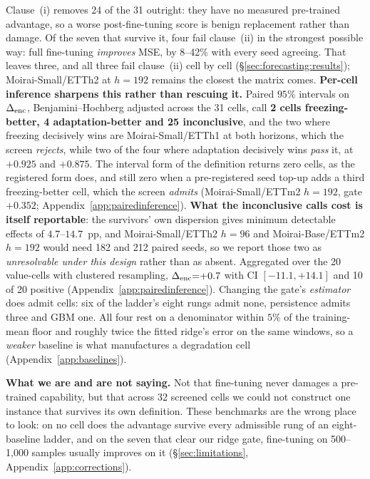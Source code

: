 Clause~(i) removes 24 of the 31 outright: they have no measured pre-trained
advantage, so a worse post-fine-tuning score is benign replacement rather than
damage.  Of the seven that survive it, four fail clause~(ii) in the strongest
possible way: full fine-tuning \emph{improves} MSE, by 8--42\% with every seed
agreeing.  That leaves three, and all three fail clause~(ii) cell by cell
(\S\ref{sec:forecasting:results}); Moirai-Small/ETTh2 at $h{=}192$ remains the
closest the matrix comes.
\textbf{Per-cell inference sharpens this rather than rescuing it.}  Paired
$95\%$ intervals on $\Delta_\text{enc}$, Benjamini--Hochberg adjusted across the 31 cells,
call \textbf{2 cells freezing-better, 4 adaptation-better and 25
inconclusive}, and the two where freezing decisively wins are
Moirai-Small/ETTh1 at both horizons, which the screen \emph{rejects}, while two
of the four where adaptation decisively wins \emph{pass} it, at $+0.925$ and
$+0.875$.  The interval form of the definition returns zero
cells, as the registered form does, and still zero when a pre-registered seed
top-up adds a third freezing-better cell, which the screen \emph{admits}
(Moirai-Small/ETTm2 $h{=}192$, gate $+0.352$;
Appendix~\ref{app:pairedinference}).  \textbf{What the inconclusive calls cost is
itself reportable}: the survivors' own dispersion gives minimum detectable
effects of $4.7$--$14.7$~pp, and Moirai-Small/ETTh2 $h{=}96$ and
Moirai-Base/ETTm2 $h{=}192$ would need 182 and 212 paired seeds, so we report
those two as \emph{unresolvable under this design} rather than as absent.
Aggregated over the 20 value-cells with clustered resampling, $\Delta_\text{enc}{=}{+}0.7$
with CI $[-11.1,{+}14.1]$ and 10 of 20 positive
(Appendix~\ref{app:pairedinference}).
Changing the gate's \emph{estimator} does admit cells: six of the ladder's eight
rungs admit none, persistence admits three and GBM one.  All four rest on a
denominator within $5\%$ of the training-mean floor and roughly twice the fitted
ridge's error on the same windows, so a \emph{weaker} baseline is what manufactures
a degradation cell (Appendix~\ref{app:baselines}).

\textbf{What we are and are not saying.}  Not that fine-tuning never damages a
pre-trained capability, but that across 32 screened cells we could not construct
one instance that survives its own definition.  These benchmarks are the wrong
place to look: on no cell does the advantage survive every admissible rung of an
eight-baseline ladder, and on the seven that clear our ridge gate, fine-tuning on
500--1{,}000 samples usually improves on it (\S\ref{sec:limitations},
Appendix~\ref{app:corrections}).

